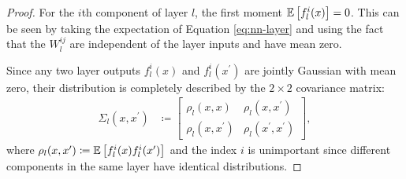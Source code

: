 \begin{refsection}
\begin{proof}
For the $i$th component of layer $l$, the first moment $\operatorname{\mathbb{E}} \left[ f_l^{i}(x)\right] = 0$. This can be seen by taking the expectation of Equation \ref{eq:nn-layer} and using the fact that the $W_l^{ij}$ are independent of the layer inputs and have mean zero.
    
    Since any two layer outputs $f_l^i(x)$ and $f_l^i(x^\prime)$ are jointly Gaussian with mean zero, their distribution is completely described by the $2\times 2$ covariance matrix:
    \begin{align*}
        \Sigma_{l}(x,x^\prime)&\coloneqq 
          \begin{bmatrix}
            \rho_{l}(x,x) & \rho_{l}(x,x^\prime)  \\
            \rho_{l}(x,x^\prime) & \rho_{l}(x^\prime,x^\prime)
          \end{bmatrix},
    \end{align*}
    where $\rho_{l}(x,x^\prime)\coloneqq\operatorname{\mathbb{E}} \left[ f_l^i(x) f_l^i(x^\prime)\right]$ and the index $i$ is unimportant since different components in the same layer have identical distributions.
    

\end{proof}
\end{refsection}
